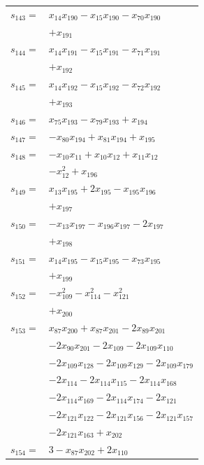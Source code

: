 \begin{longtable}{@{}r@{\;}l@{}}
\(s_{143}=\) & \(\displaystyle x_{14}x_{190} -x_{15}x_{190} -x_{70}x_{190}\) \\
 & \(\displaystyle +x_{191}\) \\[3pt]
\(s_{144}=\) & \(\displaystyle x_{14}x_{191} -x_{15}x_{191} -x_{71}x_{191}\) \\
 & \(\displaystyle +x_{192}\) \\[3pt]
\(s_{145}=\) & \(\displaystyle x_{14}x_{192} -x_{15}x_{192} -x_{72}x_{192}\) \\
 & \(\displaystyle +x_{193}\) \\[3pt]
\(s_{146}=\) & \(\displaystyle x_{75}x_{193} -x_{79}x_{193} +x_{194}\) \\[3pt]
\(s_{147}=\) & \(\displaystyle -x_{80}x_{194} +x_{81}x_{194} +x_{195}\) \\[3pt]
\(s_{148}=\) & \(\displaystyle -x_{10}x_{11} +x_{10}x_{12} +x_{11}x_{12}\) \\
 & \(\displaystyle -x_{12}^{2} +x_{196}\) \\[3pt]
\(s_{149}=\) & \(\displaystyle x_{13}x_{195} +2x_{195} -x_{195}x_{196}\) \\
 & \(\displaystyle +x_{197}\) \\[3pt]
\(s_{150}=\) & \(\displaystyle -x_{13}x_{197} -x_{196}x_{197} -2x_{197}\) \\
 & \(\displaystyle +x_{198}\) \\[3pt]
\(s_{151}=\) & \(\displaystyle x_{14}x_{195} -x_{15}x_{195} -x_{73}x_{195}\) \\
 & \(\displaystyle +x_{199}\) \\[3pt]
\(s_{152}=\) & \(\displaystyle -x_{109}^{2} -x_{114}^{2} -x_{121}^{2}\) \\
 & \(\displaystyle +x_{200}\) \\[3pt]
\(s_{153}=\) & \(\displaystyle x_{87}x_{200} +x_{87}x_{201} -2x_{89}x_{201}\) \\
 & \(\displaystyle -2x_{90}x_{201} -2x_{109} -2x_{109}x_{110}\) \\
 & \(\displaystyle -2x_{109}x_{128} -2x_{109}x_{129} -2x_{109}x_{179}\) \\
 & \(\displaystyle -2x_{114} -2x_{114}x_{115} -2x_{114}x_{168}\) \\
 & \(\displaystyle -2x_{114}x_{169} -2x_{114}x_{174} -2x_{121}\) \\
 & \(\displaystyle -2x_{121}x_{122} -2x_{121}x_{156} -2x_{121}x_{157}\) \\
 & \(\displaystyle -2x_{121}x_{163} +x_{202}\) \\[3pt]
\(s_{154}=\) & \(\displaystyle 3 -x_{87}x_{202} +2x_{110}\) \\

\end{longtable}
